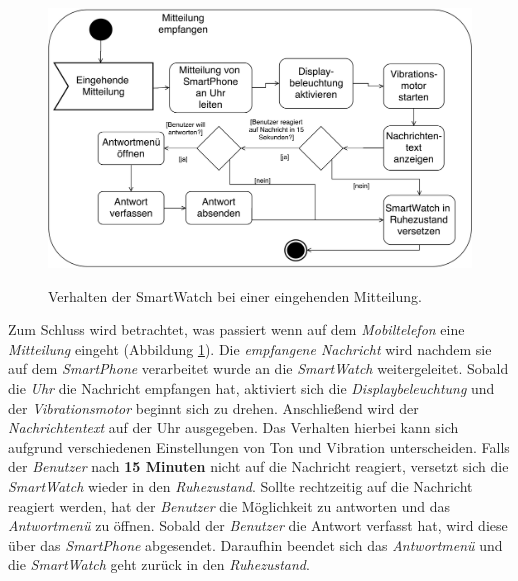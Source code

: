 \begin{figure}[h]
\centering\
\includegraphics[width=\textwidth]{img/activityMitteilung}
\caption{Verhalten der SmartWatch bei einer eingehenden Mitteilung.}\label{fig:activityMitteilung}
\end{figure}
Zum Schluss wird betrachtet, was passiert wenn auf dem \textit{Mobiltelefon} eine \textit{Mitteilung} eingeht (Abbildung \ref{fig:activityMitteilung}). Die \textit{empfangene Nachricht} wird nachdem sie auf dem \textit{SmartPhone} verarbeitet wurde an die \textit{SmartWatch} weitergeleitet. Sobald die \textit{Uhr} die Nachricht empfangen hat, aktiviert sich die \textit{Displaybeleuchtung} und der \textit{Vibrationsmotor} beginnt sich zu drehen. Anschließend wird der \textit{Nachrichtentext} auf der Uhr ausgegeben. Das Verhalten hierbei kann sich aufgrund verschiedenen Einstellungen von Ton und Vibration unterscheiden. Falls der \textit{Benutzer} nach \textbf{15 Minuten} nicht auf die Nachricht reagiert, versetzt sich die \textit{SmartWatch} wieder in den \textit{Ruhezustand}. Sollte rechtzeitig auf die Nachricht reagiert werden, hat der \textit{Benutzer} die Möglichkeit zu antworten und das \textit{Antwortmenü} zu öffnen. Sobald der \textit{Benutzer} die Antwort verfasst hat, wird diese über das \textit{SmartPhone} abgesendet. Daraufhin beendet sich das \textit{Antwortmenü} und die \textit{SmartWatch} geht zurück in den \textit{Ruhezustand}.
